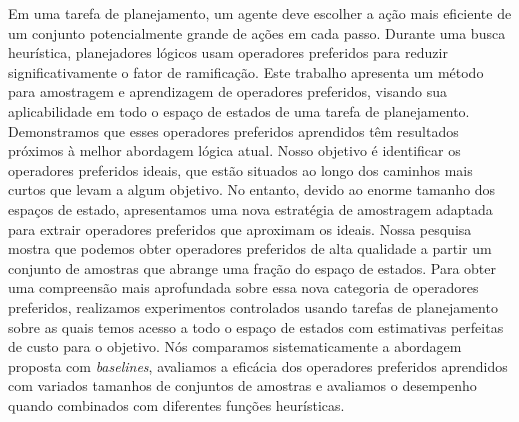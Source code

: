 \documentclass[ppgc,diss,english]{iiufrgs}
\begin{document}
\begin{translatedabstract}
Em uma tarefa de planejamento, um agente deve escolher a ação mais eficiente de um conjunto potencialmente grande de ações em cada passo. Durante uma busca heurística, planejadores lógicos usam operadores preferidos para reduzir significativamente o fator de ramificação. Este trabalho apresenta um método para amostragem e aprendizagem de operadores preferidos, visando sua aplicabilidade em todo o espaço de estados de uma tarefa de planejamento. Demonstramos que esses operadores preferidos aprendidos têm resultados próximos à melhor abordagem lógica atual.
Nosso objetivo é identificar os operadores preferidos ideais, que estão situados ao longo dos caminhos mais curtos que levam a algum objetivo. No entanto, devido ao enorme tamanho dos espaços de estado, apresentamos uma nova estratégia de amostragem adaptada para extrair operadores preferidos que aproximam os ideais. Nossa pesquisa mostra que podemos obter operadores preferidos de alta qualidade a partir um conjunto de amostras que abrange uma fração do espaço de estados.
Para obter uma compreensão mais aprofundada sobre essa nova categoria de operadores preferidos, realizamos experimentos controlados usando tarefas de planejamento sobre as quais temos acesso a todo o espaço de estados com estimativas perfeitas de custo para o objetivo. Nós comparamos sistematicamente a abordagem proposta com \textit{baselines}, avaliamos a eficácia dos operadores preferidos aprendidos com variados tamanhos de conjuntos de amostras e avaliamos o desempenho quando combinados com diferentes funções heurísticas.
\end{translatedabstract}
\end{document}
